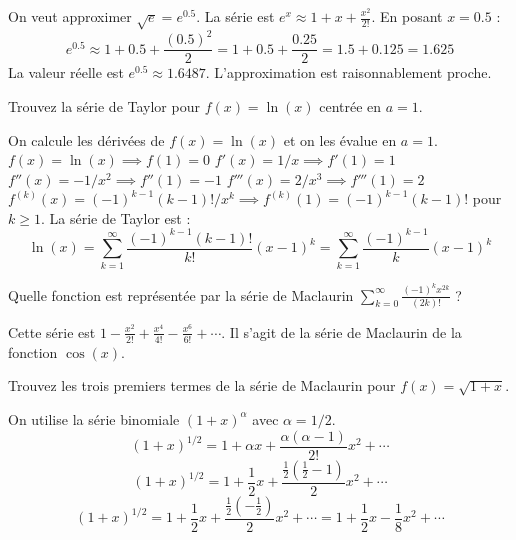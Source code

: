 \begin{correctionbox}
On veut approximer $\sqrt{e} = e^{0.5}$. La série est $e^x \approx 1 + x + \frac{x^2}{2!}$.
En posant $x=0.5$ :
$$ e^{0.5} \approx 1 + 0.5 + \frac{(0.5)^2}{2} = 1 + 0.5 + \frac{0.25}{2} = 1.5 + 0.125 = 1.625 $$
La valeur réelle est $e^{0.5} \approx 1.6487$. L'approximation est raisonnablement proche.
\end{correctionbox}

\begin{exercicebox}
Trouvez la série de Taylor pour $f(x) = \ln(x)$ centrée en $a=1$.
\end{exercicebox}

\begin{correctionbox}
On calcule les dérivées de $f(x)=\ln(x)$ et on les évalue en $a=1$.
$f(x) = \ln(x) \implies f(1) = 0$
$f'(x) = 1/x \implies f'(1) = 1$
$f''(x) = -1/x^2 \implies f''(1) = -1$
$f'''(x) = 2/x^3 \implies f'''(1) = 2$
$f^{(k)}(x) = (-1)^{k-1}(k-1)!/x^k \implies f^{(k)}(1) = (-1)^{k-1}(k-1)!$ pour $k \ge 1$.
La série de Taylor est :
$$ \ln(x) = \sum_{k=1}^{\infty} \frac{(-1)^{k-1}(k-1)!}{k!} (x-1)^k = \sum_{k=1}^{\infty} \frac{(-1)^{k-1}}{k} (x-1)^k $$
\end{correctionbox}

\begin{exercicebox}
Quelle fonction est représentée par la série de Maclaurin $ \sum_{k=0}^{\infty} \frac{(-1)^k x^{2k}}{(2k)!} $ ?
\end{exercicebox}

\begin{correctionbox}
Cette série est $1 - \frac{x^2}{2!} + \frac{x^4}{4!} - \frac{x^6}{6!} + \cdots$. Il s'agit de la série de Maclaurin de la fonction $\cos(x)$.
\end{correctionbox}

\begin{exercicebox}
Trouvez les trois premiers termes de la série de Maclaurin pour $f(x) = \sqrt{1+x}$.
\end{exercicebox}

\begin{correctionbox}
On utilise la série binomiale $(1+x)^\alpha$ avec $\alpha=1/2$.
$$ (1+x)^{1/2} = 1 + \alpha x + \frac{\alpha(\alpha-1)}{2!}x^2 + \cdots $$
$$ (1+x)^{1/2} = 1 + \frac{1}{2}x + \frac{\frac{1}{2}(\frac{1}{2}-1)}{2}x^2 + \cdots $$
$$ (1+x)^{1/2} = 1 + \frac{1}{2}x + \frac{\frac{1}{2}(-\frac{1}{2})}{2}x^2 + \cdots = 1 + \frac{1}{2}x - \frac{1}{8}x^2 + \cdots $$
\end{correctionbox}

